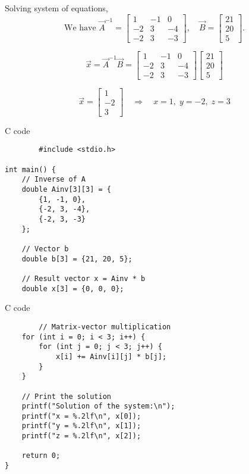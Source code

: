 \documentclass{beamer}
\begin{document}
\begin{frame}  
Solving system of equations,
\[
\text{We have } 
\vec{A}^{-1} =
\begin{bmatrix}
1 & -1 & 0 \\[4pt]
-2 & 3 & -4 \\[4pt]
-2 & 3 & -3
\end{bmatrix}, 
\quad
\vec{B} =
\begin{bmatrix}
21 \\[4pt]
20 \\[4pt]
5
\end{bmatrix}.
\]

\[
\vec{x} = \vec{A}^{-1}\vec{B} =
\begin{bmatrix}
1 & -1 & 0 \\[4pt]
-2 & 3 & -4 \\[4pt]
-2 & 3 & -3
\end{bmatrix}
\begin{bmatrix}
21 \\[4pt]
20 \\[4pt]
5
\end{bmatrix}
\]

\[
\vec{x} =
\begin{bmatrix}
1 \\[4pt]
-2 \\[4pt]
3
\end{bmatrix}
\quad \Longrightarrow \quad
\boxed{x=1,\; y=-2,\; z=3}
\]
\end{frame}

\begin{frame}[fragile]{C code}
    \begin{lstlisting}
        #include <stdio.h>

int main() {
    // Inverse of A
    double Ainv[3][3] = {
        {1, -1, 0},
        {-2, 3, -4},
        {-2, 3, -3}
    };

    // Vector b
    double b[3] = {21, 20, 5};

    // Result vector x = Ainv * b
    double x[3] = {0, 0, 0};
    \end{lstlisting}
\end{frame}

\begin{frame}[fragile]{C code}
    \begin{lstlisting}
        // Matrix-vector multiplication
    for (int i = 0; i < 3; i++) {
        for (int j = 0; j < 3; j++) {
            x[i] += Ainv[i][j] * b[j];
        }
    }

    // Print the solution
    printf("Solution of the system:\n");
    printf("x = %.2lf\n", x[0]);
    printf("y = %.2lf\n", x[1]);
    printf("z = %.2lf\n", x[2]);

    return 0;
}
    \end{lstlisting}
\end{frame}
\end{document}
